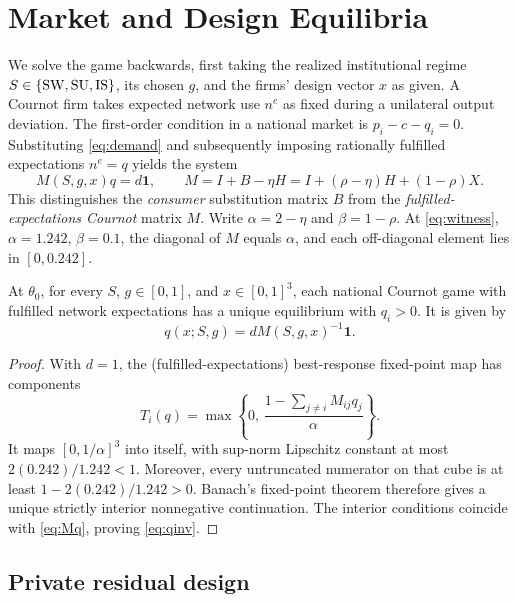 \section{Market and Design Equilibria}\label{sec:equilibrium}

We solve the game backwards, first taking the realized institutional
regime $S\in\{\mathrm{SW},\mathrm{SU},\mathrm{IS}\}$, its chosen $g$, and the firms' design
vector $x$ as given. A Cournot firm takes expected network use
$n^e$ as fixed during a unilateral output deviation. The first-order
condition in a national market is
$p_i-c-q_i=0$. Substituting \eqref{eq:demand} and subsequently imposing
rationally fulfilled expectations $n^e=q$ yields the system
\begin{equation}\label{eq:Mq}
 M(S,g,x)q=d\mathbf{1},\qquad
 M=I+B-\eta H
 =I+(\rho-\eta)H+(1-\rho)X.
\end{equation}
This distinguishes the \emph{consumer} substitution matrix $B$
from the \emph{fulfilled-expectations Cournot} matrix $M$.
Write $\alpha=2-\eta$ and $\beta=1-\rho$.
At \eqref{eq:witness}, $\alpha=1.242$, $\beta=0.1$, the diagonal
of $M$ equals $\alpha$, and each off-diagonal element lies in
$[0,0.242]$.

\begin{lemma}
\label{lem:quantities}
At $\theta_0$, for every $S$, $g\in[0,1]$, and
$x\in[0,1]^3$, each national Cournot game with fulfilled
network expectations has a unique equilibrium with $q_i>0$.
It is given by
\begin{equation}\label{eq:qinv}
 q(x;S,g)=dM(S,g,x)^{-1}\mathbf{1}.
\end{equation}
\end{lemma}
\begin{proof}
With $d=1$, the (fulfilled-expectations) best-response fixed-point
map has components
\[
 T_i(q)=\max\left\{0,\,
 \frac{1-\sum_{j\ne i}M_{ij}q_j}{\alpha}\right\}.
\]
It maps $[0,1/\alpha]^3$ into itself, with sup-norm Lipschitz
constant at most $2(0.242)/1.242<1$. Moreover, every
untruncated numerator on that cube is at least
$1-2(0.242)/1.242>0$. Banach's fixed-point theorem
therefore gives a unique strictly interior nonnegative
continuation. The interior conditions coincide with
\eqref{eq:Mq}, proving \eqref{eq:qinv}.
\end{proof}

\subsection{Private residual design}

